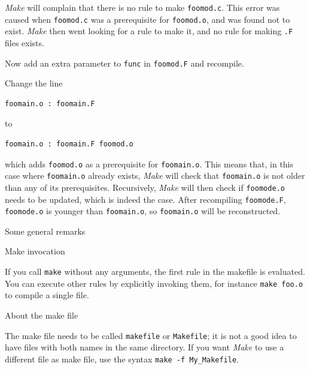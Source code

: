   {\emph{Make} will complain that there is no rule to make
    \lstinline{foomod.c}. This error was caused when \lstinline{foomod.c} was a
    prerequisite for \lstinline{foomod.o}, and was found not to
    exist. \emph{Make} then went looking for a rule to make it, and no
    rule for making \lstinline{.F} files exists.}{}

Now add an extra
parameter to \lstinline{func} in \lstinline{foomod.F} and recompile. 


Change the line
\begin{lstlisting}
foomain.o : foomain.F
\end{lstlisting}
to
\begin{lstlisting}
foomain.o : foomain.F foomod.o
\end{lstlisting}
which adds \lstinline{foomod.o} as a prerequisite for \lstinline{foomain.o}. This
means that, in this case where \lstinline{foomain.o} already exists,
\emph{Make} will check that \lstinline{foomain.o} is not older than any of its
prerequisites. Recursively, \emph{Make} will then check if
\lstinline{foomode.o} needs to be updated, which is indeed the case.
After recompiling \lstinline{foomode.F}, \lstinline{foomode.o} is younger than
\lstinline{foomain.o}, so \lstinline{foomain.o} will be reconstructed.



 {Some general remarks}

 {Make invocation}

If you call \lstinline{make} without any arguments,
the first rule in the makefile is evaluated. You can execute other
rules by explicitly invoking them, for instance \lstinline{make foo.o} to
compile a single file.


 {About the make file}

The make file needs to be called \lstinline{makefile} or
\lstinline{Makefile}; it is not a good idea to have files with both names in
the same directory.
If you want \emph{Make} to use a different file as make file, use the
syntax \lstinline{make -f My_Makefile}.

